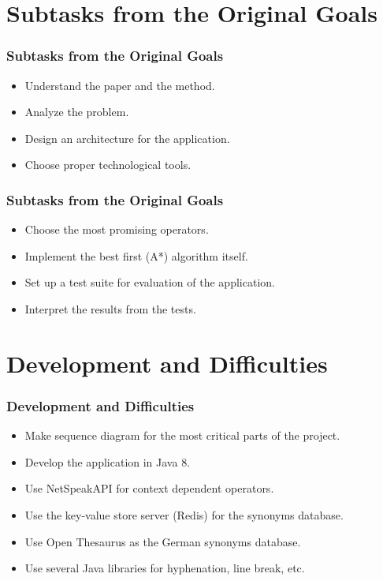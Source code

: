 \documentclass{beamer}
\begin{document}
\section{Subtasks from the Original Goals}
\begin{frame}
\frametitle{Subtasks from the Original Goals}
\begin{itemize}
	\item Understand the paper and the method.
	\item Analyze the problem.
	\item Design an architecture for the application.
	\item Choose proper technological tools.
\end{itemize}
\end{frame}

\begin{frame}
\frametitle{Subtasks from the Original Goals}
\begin{itemize}
	\item Choose the most promising operators.
	\item Implement the best first (A*) algorithm itself.
	\item Set up a test suite for evaluation of the application.
	\item Interpret the results from the tests.
\end{itemize}
\end{frame}

\section{Development and Difficulties}
\begin{frame}
\frametitle{Development and Difficulties}
\begin{itemize}
	\item Make sequence diagram for the most critical parts of the project.
	\item Develop the application in Java 8.
	\item Use NetSpeakAPI for context dependent operators.
	\item Use the key-value store server (Redis) for the synonyms database.
	\item Use Open Thesaurus as the German synonyms database.
	\item Use several Java libraries for hyphenation, line break, etc.
	
\end{itemize}
\end{frame}
\end{document}
